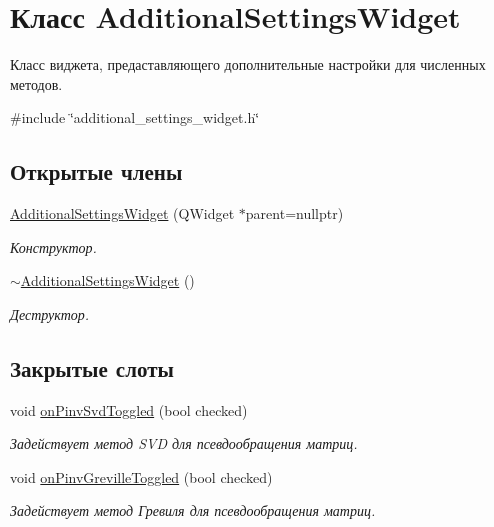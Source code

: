 \hypertarget{class_additional_settings_widget}{}\section{Класс Additional\+Settings\+Widget}
\label{class_additional_settings_widget}


Класс виджета, предаставляющего дополнительные настройки для численных методов.  




{\ttfamily \#include \char`\"{}additional\+\_\+settings\+\_\+widget.\+h\char`\"{}}

\subsection*{Открытые члены}
\begin{DoxyCompactItemize}
\item 
\hypertarget{class_additional_settings_widget_a77a6ec05e073b3710fd6dd3651c5ba2c}{}\label{class_additional_settings_widget_a77a6ec05e073b3710fd6dd3651c5ba2c} 
\hyperlink{class_additional_settings_widget_a77a6ec05e073b3710fd6dd3651c5ba2c}{Additional\+Settings\+Widget} (Q\+Widget $\ast$parent=nullptr)
\begin{DoxyCompactList}\small\item\em Конструктор. \end{DoxyCompactList}\item 
\hypertarget{class_additional_settings_widget_a375c84f23821d01d91289b57daa098a5}{}\label{class_additional_settings_widget_a375c84f23821d01d91289b57daa098a5} 
\hyperlink{class_additional_settings_widget_a375c84f23821d01d91289b57daa098a5}{$\sim$\+Additional\+Settings\+Widget} ()
\begin{DoxyCompactList}\small\item\em Деструктор. \end{DoxyCompactList}\end{DoxyCompactItemize}
\subsection*{Закрытые слоты}
\begin{DoxyCompactItemize}
\item 
void \hyperlink{class_additional_settings_widget_a18833f1a993762babf170e952074cf50}{on\+Pinv\+Svd\+Toggled} (bool checked)
\begin{DoxyCompactList}\small\item\em Задействует метод S\+VD для псевдообращения матриц. \end{DoxyCompactList}\item 
void \hyperlink{class_additional_settings_widget_ae1174df17848122030d877a75ce5dd7d}{on\+Pinv\+Greville\+Toggled} (bool checked)
\begin{DoxyCompactList}\small\item\em Задействует метод Гревиля для псевдообращения матриц. \end{DoxyCompactList}\end{DoxyCompactItemize}
